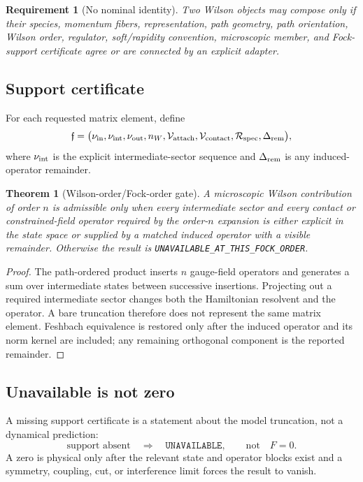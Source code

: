 \documentclass[11pt]{article}
\newtheorem{requirement}[definition]{Requirement}
\newtheorem{theorem}[definition]{Theorem}
\newcommand{\cR}{\mathcal R}
\newcommand{\cV}{\mathcal V}
\begin{document}
\begin{requirement}[No nominal identity]
Two Wilson objects may compose only if their species, momentum fibers,
representation, path geometry, path orientation, Wilson order, regulator,
soft/rapidity convention, microscopic member, and Fock-support certificate
agree or are connected by an explicit adapter.
\end{requirement}

\subsection{Support certificate}

For each requested matrix element, define
\begin{equation}
 \mathfrak f=
 \bigl(
 \nu_{\rm in},\nu_{\rm int},\nu_{\rm out},
 n_W,\cV_{\rm attach},\cV_{\rm contact},
 \cR_{\rm spec},\Delta_{\rm rem}
 \bigr),
 \label{eq:support-certificate}
\end{equation}
where \(\nu_{\rm int}\) is the explicit intermediate-sector sequence and
\(\Delta_{\rm rem}\) is any induced-operator remainder.

\begin{theorem}[Wilson-order/Fock-order gate]
A microscopic Wilson contribution of order \(n\) is admissible only when every
intermediate sector and every contact or constrained-field operator required
by the order-\(n\) expansion is either explicit in the state space or supplied
by a matched induced operator with a visible remainder.  Otherwise the result
is \texttt{UNAVAILABLE\_AT\_THIS\_FOCK\_ORDER}.
\end{theorem}

\begin{proof}
The path-ordered product inserts \(n\) gauge-field operators and generates a
sum over intermediate states between successive insertions.  Projecting out a
required intermediate sector changes both the Hamiltonian resolvent and the
operator.  A bare truncation therefore does not represent the same matrix
element.  Feshbach equivalence is restored only after the induced operator and
its norm kernel are included; any remaining orthogonal component is the
reported remainder.
\end{proof}

\subsection{Unavailable is not zero}

A missing support certificate is a statement about the model truncation, not
a dynamical prediction:
\begin{equation}
 \text{support absent}
 \quad\Longrightarrow\quad
 \texttt{UNAVAILABLE},
 \qquad
 \text{not}\quad F=0.
 \label{eq:unavailable-not-zero}
\end{equation}
A zero is physical only after the relevant state and operator blocks exist and
a symmetry, coupling, cut, or interference limit forces the result to vanish.
\end{document}
